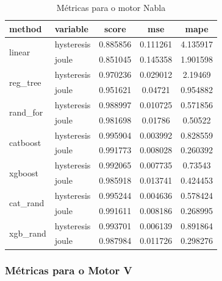 \documentclass{article}
\begin{document}
\begin{table}[h!]
\centering
\caption{Métricas para o motor Nabla}
\begin{tabular}{llccc}
\toprule
\textbf{method} & \textbf{variable} & \textbf{score} & \textbf{mse} & \textbf{mape} \\
\midrule
\multirow{2}{*}{linear} 
    & hysteresis & 0.885856 & 0.111261 & 4.135917 \\
    & joule      & 0.851045 & 0.145358 & 1.901598 \\
\midrule
\multirow{2}{*}{reg\_tree} 
    & hysteresis & 0.970236 & 0.029012 & 2.19469 \\
    & joule      & 0.951621 & 0.04721 & 0.954882 \\
\midrule
\multirow{2}{*}{rand\_for} 
    & hysteresis & 0.988997 & 0.010725 & 0.571856 \\
    & joule      & 0.981698 & 0.01786 & 0.50522 \\
\midrule
\multirow{2}{*}{catboost} 
    & hysteresis & 0.995904 & 0.003992 & 0.828559 \\
    & joule      & 0.991773 & 0.008028 & 0.260392 \\
\midrule
\multirow{2}{*}{xgboost} 
    & hysteresis & 0.992065 & 0.007735 & 0.73543 \\
    & joule      & 0.985918 & 0.013741 & 0.424453 \\
\midrule
\multirow{2}{*}{cat\_rand} 
    & hysteresis & 0.995244 &	0.004636 &	0.578424\\
    & joule      & 0.991611 &	0.008186 &	0.268995\\
\midrule
\multirow{2}{*}{xgb\_rand} 
    & hysteresis & 0.993701 &	0.006139 &	0.891864\\
    & joule      &  0.987984 &	0.011726 &	0.298276\\
\bottomrule
\end{tabular}
\end{table}



\subsubsection{Métricas para o Motor V}
\end{document}
